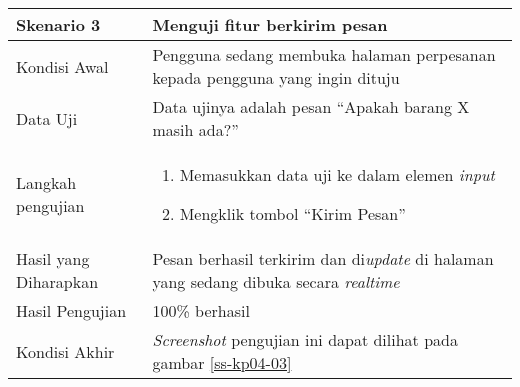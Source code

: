 \begin{longtable}{|X|X|}
		
	\textbf{Skenario 3}
		& Menguji fitur berkirim pesan \\ \hline
	Kondisi Awal
		& Pengguna sedang membuka halaman perpesanan kepada pengguna yang ingin dituju\\ \hline
	Data Uji
		& Data ujinya adalah pesan ``Apakah barang X masih ada?'' \\ \hline
	Langkah pengujian
		& \begin{enumerate}
		\item Memasukkan data uji ke dalam elemen \textit{input} 
		\item Mengklik tombol ``Kirim Pesan''
	\end{enumerate} \\ \hline
	Hasil yang Diharapkan
		& Pesan berhasil terkirim dan di\textit{update} di halaman yang sedang dibuka secara \textit{realtime} \\ \hline
	Hasil Pengujian
		& 100\% berhasil \\ \hline	
	Kondisi Akhir
		& \textit{Screenshot} pengujian ini dapat dilihat pada gambar \ref{ss-kp04-03}  \\ \hline	
		
\end{longtable}